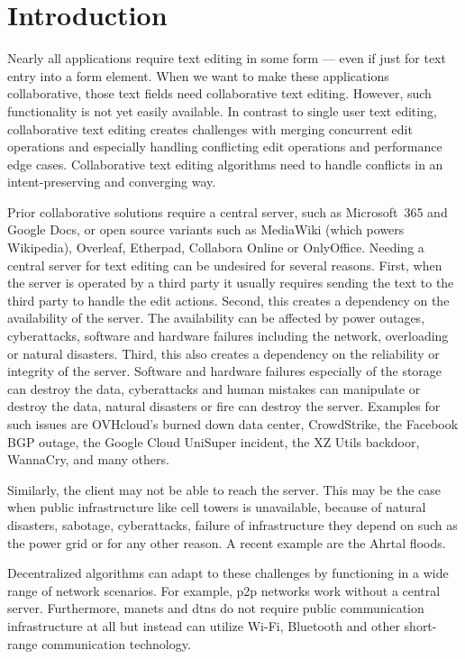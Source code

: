 \chapter{Introduction} \label{introduction}

Nearly all applications require text editing in some form --- even if just for text entry into a form element. When we want to make these applications collaborative, those text fields need collaborative text editing. However, such functionality is not yet easily available. In contrast to single user text editing, collaborative text editing creates challenges with merging concurrent edit operations and especially handling conflicting edit operations and performance edge cases. Collaborative text editing algorithms need to handle conflicts in an intent-preserving and converging way.

Prior collaborative solutions require a central server, such as Microsoft~365 and Google Docs, or open source variants such as MediaWiki (which powers Wikipedia), Overleaf, Etherpad, Collabora Online or OnlyOffice. Needing a central server for text editing can be undesired for several reasons. First, when the server is operated by a third party it usually requires sending the text to the third party to handle the edit actions. Second, this creates a dependency on the availability of the server. The availability can be affected by power outages, cyberattacks, software and hardware failures including the network, overloading or natural disasters. Third, this also creates a dependency on the reliability or integrity of the server. Software and hardware failures especially of the storage can destroy the data, cyberattacks and human mistakes can manipulate or destroy the data, natural disasters or fire can destroy the server. Examples for such issues are OVHcloud's burned down data center, CrowdStrike, the Facebook BGP outage, the Google Cloud UniSuper incident, the XZ Utils backdoor, WannaCry, and many others.

Similarly, the client may not be able to reach the server. This may be the case when public infrastructure like cell towers is unavailable, because of natural disasters, sabotage, cyberattacks, failure of infrastructure they depend on such as the power grid or for any other reason. A recent example are the Ahrtal floods.

Decentralized algorithms can adapt to these challenges by functioning in a wide range of network scenarios. For example, \gls{p2p} networks work without a central server. Furthermore, \glspl{manet} and \glspl{dtn} do not require public communication infrastructure at all but instead can utilize Wi-Fi, Bluetooth and other short-range communication technology.

